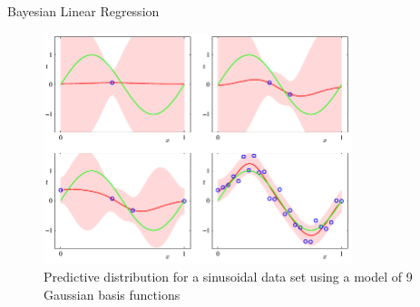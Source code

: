 \documentclass[9pt]{beamer}
\begin{document}
\begin{frame}{Bayesian Linear Regression}
        \begin{figure}[H]
            \includegraphics[width=9cm]{../images/Bishop_MachineLearning_Figure3-8.png} %
                \caption{Predictive distribution for a sinusoidal data set using a model of 9 Gaussian basis functions}
            \label{fig:3.8}
        \end{figure}
\end{frame}

\end{document}
